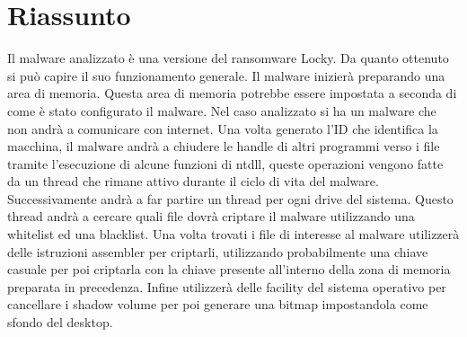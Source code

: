 \documentclass[a4paper,12pt]{article}
\begin{document}
\section{Riassunto}
Il malware analizzato è una versione del ransomware Locky. Da quanto ottenuto si può capire il suo funzionamento generale. Il malware inizierà preparando una area di memoria. Questa area di memoria potrebbe essere impostata a seconda di come è stato configurato il malware. Nel caso analizzato si ha un malware che non andrà a comunicare con internet. Una volta generato l'ID che identifica la macchina, il malware andrà a chiudere le handle di altri programmi verso i file tramite l'esecuzione di alcune funzioni di ntdll, queste operazioni vengono fatte da un thread che rimane attivo durante il ciclo di vita del malware. Successivamente andrà a far partire un thread per ogni drive del sistema. Questo thread andrà a cercare quali file dovrà criptare il malware utilizzando una whitelist ed una blacklist. Una volta trovati i file di interesse al malware utilizzerà delle istruzioni assembler per criptarli, utilizzando probabilmente una chiave casuale per poi criptarla con la chiave presente all'interno della zona di memoria preparata in precedenza. Infine utilizzerà delle facility del sistema operativo per cancellare i shadow volume per poi generare una bitmap impostandola come sfondo del desktop. 
\end{document}
